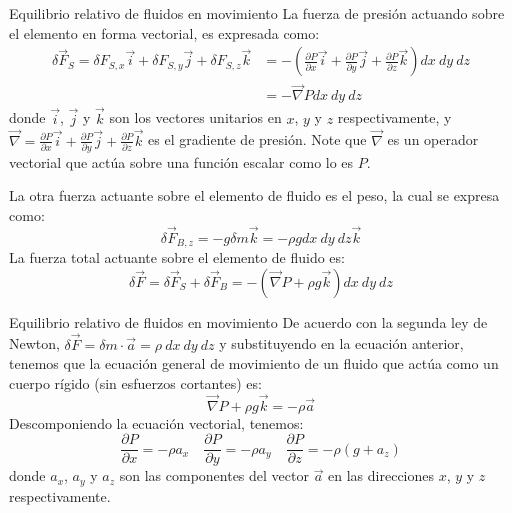 \documentclass [xcolor=svgnames, t] {beamer}
\begin{document}
\begin{frame}{Equilibrio relativo de fluidos en movimiento}
La fuerza de presi\'on actuando sobre el elemento en forma vectorial, es expresada como:
\begin{align*}
\delta \vec{F}_S = \delta F_{S,x}\vec{i} + \delta F_{S,y} \vec{j} + \delta F_{S,z}\vec{k} &= -\left( \frac{\partial P}{\partial x}\vec{i} + \frac{\partial P}{\partial y}\vec{j} + \frac{\partial P}{\partial z}\vec{k} \right) dx\ dy\ dz \\
&= -\vec{\nabla}P dx\ dy\ dz
\end{align*}
donde $\vec{i}$, $\vec{j}$ y $\vec{k}$ son los vectores unitarios en $x$, $y$ y $z$ respectivamente, y $\vec{\nabla}= \frac{\partial P}{\partial x}\vec{i} + \frac{\partial P}{\partial y}\vec{j} + \frac{\partial P}{\partial z}\vec{k}$ es el gradiente de presi\'on. Note que $\vec{\nabla}$ es un operador vectorial que act\'ua sobre una funci\'on escalar como lo es $P$.

La otra fuerza actuante sobre el elemento de fluido es el peso, la cual se expresa como:
$$
\delta \vec{F}_{B,z} = -g \delta m \vec{k} = -\rho g dx\ dy\ dz \vec{k}
$$
La fuerza total actuante sobre el elemento de fluido es:
$$
\delta \vec{F} = \delta \vec{F}_S + \delta \vec{F}_B = -\left( \vec{\nabla}P + \rho g \vec{k}\right) dx\ dy\ dz
$$
\end{frame}

\begin{frame}{Equilibrio relativo de fluidos en movimiento}
De acuerdo con la segunda ley de Newton, $\delta \vec{F} = \delta m \cdot \vec{a} = \rho\ dx\ dy\ dz$ y substituyendo en la ecuaci\'on anterior, tenemos que la ecuaci\'on general de movimiento de un fluido que act\'ua como un cuerpo r\'igido (sin esfuerzos cortantes) es:
$$
\vec{\nabla}P + \rho g \vec{k} = -\rho \vec{a}
$$
Descomponiendo la ecuaci\'on vectorial, tenemos:
$$
\frac{\partial P}{\partial x} = -\rho a_x \quad \frac{\partial P}{\partial y} = -\rho a_y \quad \frac{\partial P}{\partial z} = -\rho (g+ a_z )
$$
donde $a_x$, $a_y$ y $a_z$ son las componentes del vector $\vec{a}$ en las direcciones $x$, $y$ y $z$ respectivamente.
\end{frame}
\end{document}
